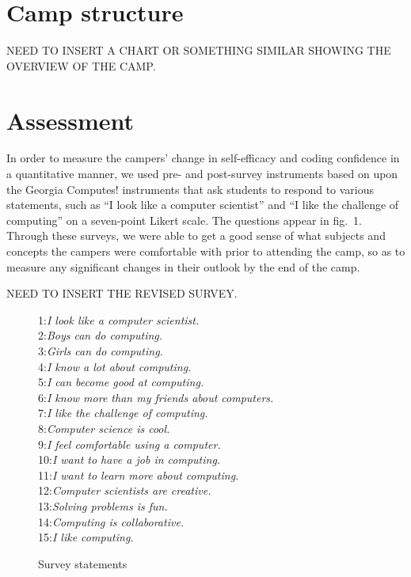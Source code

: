 \section{Camp structure}

NEED TO INSERT A CHART OR SOMETHING SIMILAR SHOWING THE OVERVIEW OF THE
CAMP.

\section{Assessment}

In order to measure the campers' change in self-efficacy and coding
confidence in a quantitative manner, we used pre- and post-survey
instruments based on upon the Georgia Computes! instruments
\cite{Bruckman2009} that ask students to respond to various statements,
such as ``I look like a computer scientist'' and ``I like the
challenge of computing'' on a seven-point Likert scale.  The questions
appear in fig.~1.  Through these surveys, we were able to get a
good sense of what subjects and concepts the campers were comfortable
with prior to attending the camp, so as to measure any significant
changes in their outlook by the end of the camp.  

NEED TO INSERT THE REVISED SURVEY.

\begin{figure}
{\small
1:\textit{I look like a computer scientist.} \\
2:\textit{Boys can do computing.} \\
3:\textit{Girls can do computing.} \\
4:\textit{I know a lot about computing.} \\
5:\textit{I can become good at computing.} \\
6:\textit{I know more than my friends about computers.} \\
7:\textit{I like the challenge of computing.} \\
8:\textit{Computer science is cool.} \\
9:\textit{I feel comfortable using a computer.} \\
10:\textit{I want to have a job in computing.} \\
11:\textit{I want to learn more about computing.} \\
12:\textit{Computer scientists are creative.} \\
13:\textit{Solving problems is fun.} \\
14:\textit{Computing is collaborative.} \\
15:\textit{I like computing.} 
}
\caption{Survey statements}
\end{figure}

